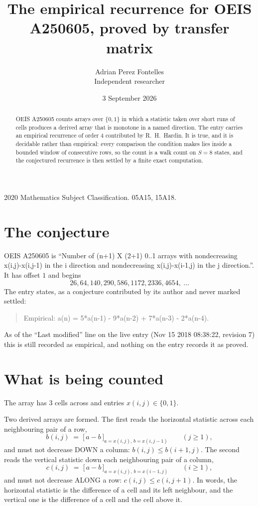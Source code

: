 \documentclass[11pt,a4paper]{article}
\title{The empirical recurrence for OEIS A250605, proved by transfer matrix}
\author{Adrian Perez Fontelles\\ \small Independent researcher}
\date{3 September 2026}
\theoremstyle{plain}
\theoremstyle{definition}
\begin{document}
\maketitle

\begin{abstract}
OEIS A250605 counts arrays over $\{0,1\}$ in which a statistic taken over short runs
of cells produces a derived array that is monotone in a named direction. The entry carries an
empirical recurrence of order $4$ contributed by R.~H.~Hardin. It is true, and it is
decidable rather than empirical: every comparison the condition makes lies inside a bounded
window of consecutive rows, so the count is a walk count on $S=8$ states, and the
conjectured recurrence is then settled by a finite exact computation.
\end{abstract}

\noindent\small 2020 Mathematics Subject Classification. 05A15, 15A18.\normalsize

\section{The conjecture}

OEIS A250605 is ``Number of (n+1) X (2+1) 0..1 arrays with nondecreasing x(i,j)-x(i,j-1) in the i direction and nondecreasing x(i,j)-x(i-1,j) in the j direction.''. It has offset $1$ and begins
\[
26, 64, 140, 290, 586, 1172, 2336, 4654,\ \dots
\]
The entry states, as a conjecture contributed by its author and never marked settled:
\begin{quote}
Empirical: a(n) = 5*a(n-1) - 9*a(n-2) + 7*a(n-3) - 2*a(n-4).
\end{quote}
As of the ``Last modified'' line on the live entry (Nov 15 2018 08:38:22, revision 7) this is still
recorded as empirical, and nothing on the entry records it as proved.

\section{What is being counted}

The array has $3$ cells across and entries $x(i,j)\in\{0,1\}$.

Two derived arrays are formed. The first reads the horizontal statistic across each
neighbouring pair of a row,
\[
b(i,j)\;=\;\bigl[\,a-b\,\bigr]_{a=x(i,j),\,b=x(i,j-1)}\qquad (j\ge1),
\]
and must not decrease DOWN a column: $b(i,j)\le b(i{+}1,j)$. The second reads the vertical
statistic down each neighbouring pair of a column,
\[
c(i,j)\;=\;\bigl[\,a-b\,\bigr]_{a=x(i,j),\,b=x(i{-}1,j)}\qquad (i\ge1),
\]
and must not decrease ALONG a row: $c(i,j)\le c(i,j{+}1)$. In words, the horizontal statistic
is the difference of a cell and its left neighbour, and the vertical one is
the difference of a cell and the cell above it.
\end{document}
